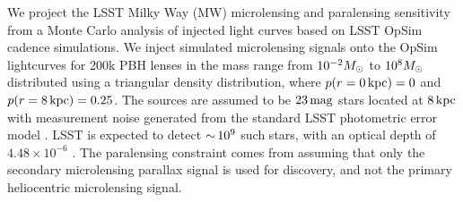We project the LSST Milky Way (MW) microlensing and paralensing sensitivity  from a Monte Carlo analysis of injected light curves based on LSST OpSim cadence simulations.
We inject simulated microlensing signals onto the OpSim lightcurves for 200k PBH lenses in the mass range from $10^{-2}M_\odot$ to $10^{8}M_\odot$ distributed using a triangular density distribution, where $p(r = 0 \mathrm{\,kpc}) = 0$ and $p(r = 8\mathrm{\,kpc}) = 0.25$.
The sources are assumed to be $23\mathrm{\,mag}$ stars located at $8\mathrm{\,kpc}$ with measurement noise generated from the standard LSST photometric error model \citep{0805.2366}.
LSST is expected to detect $ {\sim}\, 10^{9}$ such stars, with an optical depth of $4.48 \times 10^{-6}$ \citep{2006ApJ...636..240S}.
The paralensing constraint comes from assuming that only the secondary microlensing parallax signal is used for discovery, and not the primary heliocentric microlensing signal.

